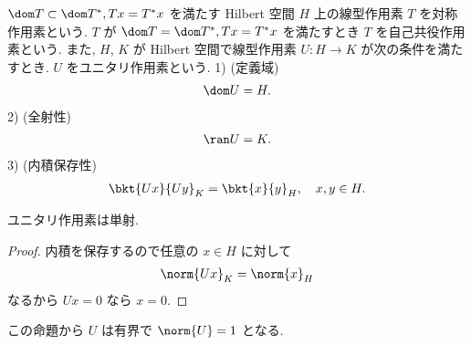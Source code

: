 \documentclass[openany, a4paper, oneside]{jsbook}
\begin{document}
\begin{defn}
 $\dom T \subset \dom T^*, Tx = T^*x$ を満たす Hilbert 空間 $H$ 上の線型作用素 $T$ を対称作用素という.
 $T$ が $\dom T = \dom T^*, Tx = T^*x$ を満たすとき $T$ を自己共役作用素という.
 また, $H$, $K$ が Hilbert 空間で線型作用素 $U \colon H \to K$ が次の条件を満たすとき. $U$ をユニタリ作用素という.
 1) \textup{(定義域)}
   \begin{align}
    \dom U = H.
   \end{align}
 2) \textup{(全射性)}
   \begin{align}
    \ran U
    =
    K.
   \end{align}
 3) \textup{(内積保存性)}
   \begin{align}
    \bkt{Ux}{Uy}_{K}
    =
    \bkt{x}{y}_{H}, \quad x, y \in H.
   \end{align}
\end{defn}

\begin{prop}
 ユニタリ作用素は単射.
\end{prop}
\begin{proof}
内積を保存するので任意の $x \in H$ に対して
\begin{align}
 \norm{Ux}_K
 =
 \norm{x}_H
\end{align}
なるから $Ux = 0$ なら $x = 0$.
\end{proof}
この命題から $U$ は有界で $\norm{U} = 1$ となる.
\end{document}
